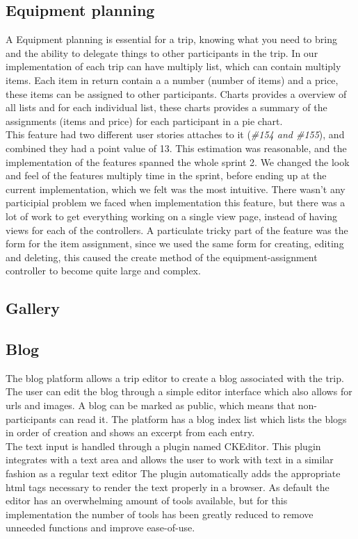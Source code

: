 \documentclass[a4paper]{article}
\begin{document}
\subsection{Equipment planning}
A Equipment planning is essential for a trip, knowing what you need to bring and the ability to delegate things to other participants in the trip. In our implementation of each trip can have multiply list, which can contain multiply items. Each item in return contain a a number (number of items) and a price, these items can be assigned to other participants. Charts provides a overview of all lists and for each individual list, these charts provides a summary of the assignments (items and price) for each participant in a pie chart. \\ This feature had two different user stories attaches to it (\emph{\#154 and \#155}), and combined they had a point value of 13. This estimation was reasonable, and the implementation of the features spanned the whole sprint 2. We changed the look and feel of the features multiply time in the sprint, before ending up at the current implementation, which we felt was the most intuitive. There wasn't any participial problem we faced when implementation this feature, but there was a lot of work to get everything working on a single view page, instead of having views for each of the controllers. A particulate tricky part of the feature was the form for the item assignment, since we used the same form for creating, editing and deleting, this caused the create method of the equipment-assignment controller to become quite large and complex. 

\subsection{Gallery}
\subsection{Blog}
The blog platform allows a trip editor to create a blog associated with the trip. The user can edit the blog through a simple editor interface which also allows for urls and images. A blog can be marked as public, which means that non-participants can read it. The platform has a blog index list which lists the blogs in order of creation and shows an excerpt from each entry.\\

\noindent
The text input is handled through a plugin named CKEditor\cite{CKEditor}. This plugin integrates with a text area and allows the user to work with text in a similar fashion as a regular text editor The plugin automatically adds the appropriate html tags necessary to render the text properly in a browser. As default the editor has an overwhelming amount of tools available, but for this implementation the number of tools has been greatly reduced to remove unneeded functions and improve ease-of-use.\\
\end{document}
